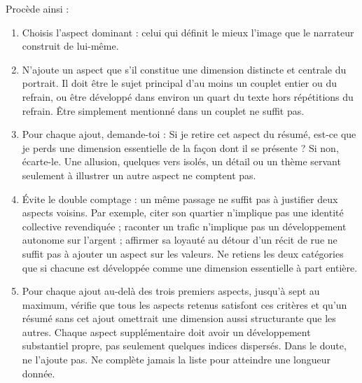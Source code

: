 Procède ainsi :
\begin{enumerate}
\item Choisis l'aspect dominant : celui qui définit le mieux l'image que le narrateur construit de lui-même.
\item N'ajoute un aspect que s'il constitue une dimension distincte et centrale du portrait. Il doit être le sujet principal d'au moins un couplet entier ou du refrain, ou être développé dans environ un quart du texte hors répétitions du refrain. Être simplement mentionné dans un couplet ne suffit pas.
\item Pour chaque ajout, demande-toi : \og Si je retire cet aspect du résumé, est-ce que je perds une dimension essentielle de la façon dont il se présente ? \fg{} Si non, écarte-le. Une allusion, quelques vers isolés, un détail ou un thème servant seulement à illustrer un autre aspect ne comptent pas.
\item Évite le double comptage : un même passage ne suffit pas à justifier deux aspects voisins. Par exemple, citer son quartier n'implique pas une identité collective revendiquée ; raconter un trafic n'implique pas un développement autonome sur l'argent ; affirmer sa loyauté au détour d'un récit de rue ne suffit pas à ajouter un aspect sur les valeurs. Ne retiens les deux catégories que si chacune est développée comme une dimension essentielle à part entière.
\item Pour chaque ajout au-delà des trois premiers aspects, jusqu'à sept au maximum, vérifie que tous les aspects retenus satisfont ces critères et qu'un résumé sans cet ajout omettrait une dimension aussi structurante que les autres. Chaque aspect supplémentaire doit avoir un développement substantiel propre, pas seulement quelques indices dispersés. Dans le doute, ne l'ajoute pas. Ne complète jamais la liste pour atteindre une longueur donnée.
\end{enumerate}

